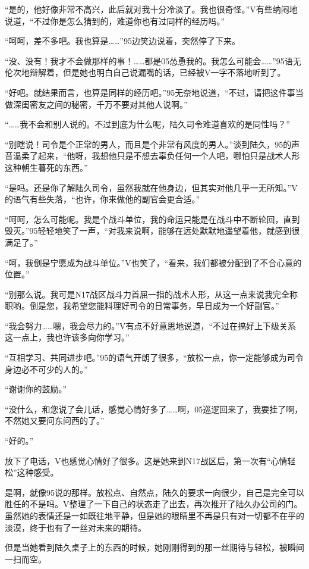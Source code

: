 “是的，他好像非常不高兴，此后就对我十分冷淡了。我也很奇怪。”V有些纳闷地说道，“不过你是怎么猜到的，难道你也有过同样的经历吗。”

“呵呵，差不多吧。我也算是……”95边笑边说着，突然停了下来。

“没、没有！我才不会做那样的事！……都是05怂恿我的。我怎么可能会……”95语无伦次地辩解着，但是她也明白自己说漏嘴的话，已经被V一字不落地听到了。

“好吧。就结果而言，也算是同样的经历吧。”95无奈地说道，“不过，请把这件事当做深闺密友之间的秘密，千万不要对其他人说啊。”

“……我不会和别人说的。不过到底为什么呢，陆久司令难道喜欢的是同性吗？”

“别瞎说！司令是个正常的男人，而且是个非常有风度的男人。”谈到陆久，95的声音温柔了起来，“他呀，我想他只是不想去辜负任何一个人吧，哪怕只是战术人形这种朝生暮死的东西。”

“是吗。还是你了解陆久司令，虽然我就在他身边，但其实对他几乎一无所知。”V的语气有些失落，“也许，你来做他的副官会更合适。”

“呵呵，怎么可能呢。我是个战斗单位，我的命运只能是在战斗中不断轮回，直到毁灭。”95轻轻地笑了一声，“对我来说啊，能够在远处默默地遥望着他，就感到很满足了。”

“呵，我倒是宁愿成为战斗单位。”V也笑了，“看来，我们都被分配到了不合心意的位置。”

“别那么说。我可是N17战区战斗力首屈一指的战术人形，从这一点来说我完全称职哟。倒是您，我希望您能料理好司令的日常事务，早日成为一个好副官。”

“我会努力……嗯，我会尽力的。”V有点不好意思地说道，“不过在搞好上下级关系这一点上，我也许该多向你学习。”

“互相学习、共同进步吧。”95的语气开朗了很多，“放松一点，你一定能够成为司令身边必不可少的人的。”

“谢谢你的鼓励。”

“没什么，和您说了会儿话，感觉心情好多了……啊，05巡逻回来了，我要挂了啊，不然她又要问东问西的了。”

“好的。”

放下了电话，V也感觉心情好了很多。这是她来到N17战区后，第一次有“心情轻松”这种感受。

是啊，就像95说的那样。放松点、自然点，陆久的要求一向很少，自己是完全可以胜任的不是吗。V整理了一下自己的状态走了出去，再次推开了陆久办公司的门。虽然她的表情还是一如既往地平静，但是她的眼睛里不再是只有对一切都不在乎的淡漠，终于也有了一丝对未来的期待。

但是当她看到陆久桌子上的东西的时候，她刚刚得到的那一丝期待与轻松，被瞬间一扫而空。

